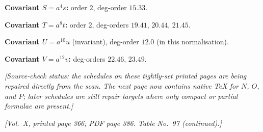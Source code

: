 \documentclass[11pt]{article}
\begin{document}
\noindent\textbf{Covariant $S=a^{4}s$:} order $2$, deg-order $15.33$.

\noindent\textbf{Covariant $T=a^{8}t$:} order $2$, deg-orders $19.41$, $20.44$, $21.45$.

\noindent\textbf{Covariant $U=a^{10}u$} (invariant), deg-order $12.0$ (in this normalisation).

\noindent\textbf{Covariant $V=a^{12}v$:} deg-orders $22.46$, $23.49$.

\medskip

\noindent\textit{[Source-check status: the schedules on these tightly-set printed pages are being repaired directly from the scan.  The next page now contains native TeX for $N$, $O$, and $P$; later schedules are still repair targets where only compact or partial formulae are present.]}

\newpage

\noindent\textit{[Vol.~X, printed page 366; PDF page 386. Table No.~97 (continued).]}

\medskip
\end{document}
